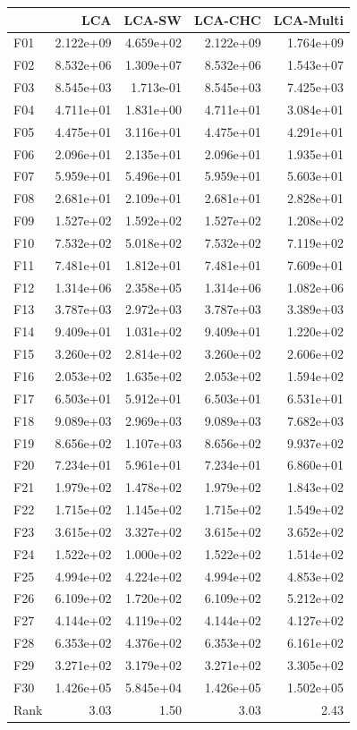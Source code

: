 \begin{tabular}{lrrrr}
\toprule
 & LCA & LCA-SW & LCA-CHC & LCA-Multi \\
\midrule
F01 & 2.122e+09 & 4.659e+02 & 2.122e+09 & 1.764e+09 \\
F02 & 8.532e+06 & 1.309e+07 & 8.532e+06 & 1.543e+07 \\
F03 & 8.545e+03 & 1.713e-01 & 8.545e+03 & 7.425e+03 \\
F04 & 4.711e+01 & 1.831e+00 & 4.711e+01 & 3.084e+01 \\
F05 & 4.475e+01 & 3.116e+01 & 4.475e+01 & 4.291e+01 \\
F06 & 2.096e+01 & 2.135e+01 & 2.096e+01 & 1.935e+01 \\
F07 & 5.959e+01 & 5.496e+01 & 5.959e+01 & 5.603e+01 \\
F08 & 2.681e+01 & 2.109e+01 & 2.681e+01 & 2.828e+01 \\
F09 & 1.527e+02 & 1.592e+02 & 1.527e+02 & 1.208e+02 \\
F10 & 7.532e+02 & 5.018e+02 & 7.532e+02 & 7.119e+02 \\
F11 & 7.481e+01 & 1.812e+01 & 7.481e+01 & 7.609e+01 \\
F12 & 1.314e+06 & 2.358e+05 & 1.314e+06 & 1.082e+06 \\
F13 & 3.787e+03 & 2.972e+03 & 3.787e+03 & 3.389e+03 \\
F14 & 9.409e+01 & 1.031e+02 & 9.409e+01 & 1.220e+02 \\
F15 & 3.260e+02 & 2.814e+02 & 3.260e+02 & 2.606e+02 \\
F16 & 2.053e+02 & 1.635e+02 & 2.053e+02 & 1.594e+02 \\
F17 & 6.503e+01 & 5.912e+01 & 6.503e+01 & 6.531e+01 \\
F18 & 9.089e+03 & 2.969e+03 & 9.089e+03 & 7.682e+03 \\
F19 & 8.656e+02 & 1.107e+03 & 8.656e+02 & 9.937e+02 \\
F20 & 7.234e+01 & 5.961e+01 & 7.234e+01 & 6.860e+01 \\
F21 & 1.979e+02 & 1.478e+02 & 1.979e+02 & 1.843e+02 \\
F22 & 1.715e+02 & 1.145e+02 & 1.715e+02 & 1.549e+02 \\
F23 & 3.615e+02 & 3.327e+02 & 3.615e+02 & 3.652e+02 \\
F24 & 1.522e+02 & 1.000e+02 & 1.522e+02 & 1.514e+02 \\
F25 & 4.994e+02 & 4.224e+02 & 4.994e+02 & 4.853e+02 \\
F26 & 6.109e+02 & 1.720e+02 & 6.109e+02 & 5.212e+02 \\
F27 & 4.144e+02 & 4.119e+02 & 4.144e+02 & 4.127e+02 \\
F28 & 6.353e+02 & 4.376e+02 & 6.353e+02 & 6.161e+02 \\
F29 & 3.271e+02 & 3.179e+02 & 3.271e+02 & 3.305e+02 \\
F30 & 1.426e+05 & 5.845e+04 & 1.426e+05 & 1.502e+05 \\
\midrule
Rank & 3.03 & 1.50 & 3.03 & 2.43 \\
\bottomrule
\end{tabular}